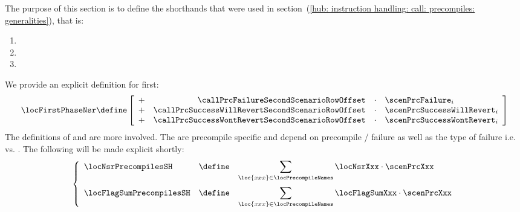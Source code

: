 The purpose of this section is to define the shorthands that were used in section~(\ref{hub: instruction handling: call: precompiles: generalities}), that is:
\begin{multicols}{3}
	\begin{enumerate}
		\item \locFirstPhaseNsr{}
		\item \locFlagSumPrecompilesSH{}
		\item \locNsrPrecompilesSH{}
	\end{enumerate}
\end{multicols}
\noindent We provide an explicit definition for \locFirstPhaseNsr{} first:
\[
	\locFirstPhaseNsr
	\define
	\left[ \begin{array}{lrcl}
		+ & \callPrcFailureSecondScenarioRowOffset           & \cdot & \scenPrcFailure_{i}       \\
		+ & \callPrcSuccessWillRevertSecondScenarioRowOffset & \cdot & \scenPrcSuccessWillRevert_{i}       \\
		+ & \callPrcSuccessWontRevertSecondScenarioRowOffset & \cdot & \scenPrcSuccessWontRevert_{i} \\
	\end{array} \right]
\]
The definitions of \locFlagSumPrecompilesSH{} and \locNsrPrecompilesSH{} are more involved.
The are precompile specific and depend on precompile \scenPrcSuccess{} / failure as well as the type of failure i.e.
\scenPrcFailureKnownToHub{} vs.
\scenPrcFailureKnownToRam{}.
The following will be made explicit shortly: 
\[
	\left\{ \begin{array}{lcl}
		\locNsrPrecompilesSH     & \define & \displaystyle \sum _{\loc{xxx} \in \locPrecompileNames} \locNsrXxx     \cdot \scenPrcXxx \vspace{2mm} \\
		\locFlagSumPrecompilesSH & \define & \displaystyle \sum _{\loc{xxx} \in \locPrecompileNames} \locFlagSumXxx \cdot \scenPrcXxx \\
	\end{array} \right.
\]
